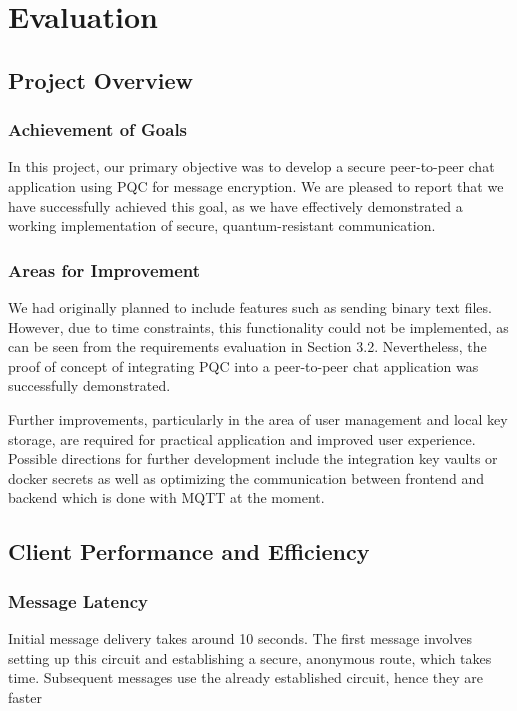 \chapter{Evaluation}

\section {Project Overview}

\subsection{Achievement of Goals}
In this project, our primary objective was to develop a secure peer-to-peer chat application using PQC for message encryption. We are pleased to report that we have successfully achieved this goal, as we have effectively demonstrated a working implementation of secure, quantum-resistant communication.

\subsection{Areas for Improvement}
We had originally planned to include features such as sending binary text files. However, due to time constraints, this functionality could not be implemented, as can be seen from the requirements evaluation in Section 3.2. Nevertheless, the proof of concept of integrating PQC into a peer-to-peer chat application was successfully demonstrated.

Further improvements, particularly in the area of user management and local key storage, are required for practical application and improved user experience. Possible directions for further development include the integration key vaults or docker secrets as well as optimizing the communication between frontend and backend which is done with MQTT at the moment.

\section {Client Performance and Efficiency}

\subsection{Message Latency}
Initial message delivery takes around 10 seconds. The first message involves setting up this circuit and establishing a secure, anonymous route, which takes time. Subsequent messages use the already established circuit, hence they are faster

